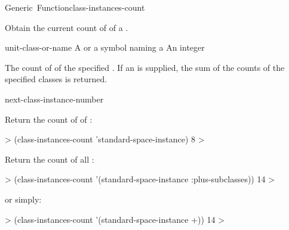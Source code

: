 \documentclass[10pt,twoside,english,pdftex]{article}
\begin{document}

\begin{functiondoc}{Generic~Function}{class-instances-count}%
  {
    }
%
%

\fnsyntax

\fnpurpose Obtain the current count of  of a
. 

\fnmethods
{}%
  {\code{(} 
  \returns{} } 
%
  {\code{(} 
  \returns{} } 
%
  {\code{(} 
  \returns{} }

\fnpackage {}

\fnmodule {}

\fnargs
\begin{args}{unit-class-or-name}
 A  or a symbol naming a
\arg[count] An integer
\end{args}

\fnreturns The count of  of the
specified .  If an
 is supplied, the sum of the
 counts of the specified classes is returned.

\begin{alsos}{next-class-instance-number}
\end{alsos}

\fnexamples
Return the count of  of
: 
%
\W\supp
\begin{example}
  > (class-instances-count 'standard-space-instance)
  8
  >
\end{example} 
%
Return the count of all :
%
\W\supp\notpretop
\begin{example}
  > (class-instances-count '(standard-space-instance :plus-subclasses))
  14
  >
\end{example} 
%
or simply:
%
\W\supp\notpretop
\begin{example}
  > (class-instances-count '(standard-space-instance +))
  14
  >
\end{example} 

\end{functiondoc}
\end{document}
